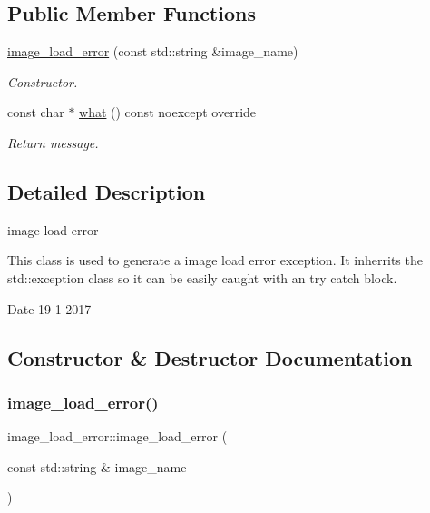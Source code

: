 \subsection*{Public Member Functions}
\begin{DoxyCompactItemize}
\item 
\hyperlink{classimage__load__error_a39665f8755ddd18f61bd837300805cd1}{image\+\_\+load\+\_\+error} (const std\+::string \&image\+\_\+name)
\begin{DoxyCompactList}\small\item\em Constructor. \end{DoxyCompactList}\item 
const char $\ast$ \hyperlink{classimage__load__error_ab73fa8f110ff313005a7bb0ed66fd880}{what} () const noexcept override
\begin{DoxyCompactList}\small\item\em Return message. \end{DoxyCompactList}\end{DoxyCompactItemize}


\subsection{Detailed Description}
image load error 

This class is used to generate a image load error exception. It inherrits the std\+::exception class so it can be easily caught with an try catch block.

\begin{DoxyDate}{Date}
19-\/1-\/2017 
\end{DoxyDate}


\subsection{Constructor \& Destructor Documentation}
\mbox{\label{classimage__load__error_a39665f8755ddd18f61bd837300805cd1}} 
\subsubsection{\texorpdfstring{image\+\_\+load\+\_\+error()}{image\_load\_error()}}
{\footnotesize\ttfamily image\+\_\+load\+\_\+error\+::image\+\_\+load\+\_\+error (\begin{DoxyParamCaption}\item[{const std\+::string \&}]{image\+\_\+name }\end{DoxyParamCaption})\hspace{0.3cm}{\ttfamily [inline]}}



